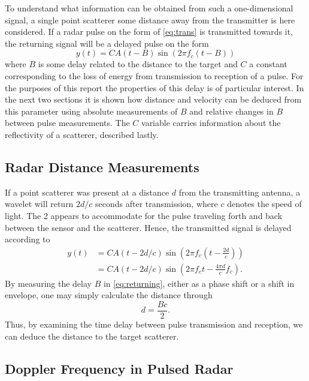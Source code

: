 To understand what information can be obtained from such a one-dimensional signal, a single point scatterer some distance away from the transmitter is here considered. If a radar pulse on the form of \eqref{eq:trans} is transmitted towards it, the returning signal will be a delayed pulse on the form \citep{richards_2014}
\begin{equation}\label{eq:returning}
	y(t) = CA(t-B)\sin(2\pi f_c (t-B))
\end{equation}
where $B$ is some delay related to the distance to the target and $C$ a constant corresponding to the loss of energy from transmission to reception of a pulse. For the purposes of this report the properties of this delay is of particular interest. In the next two sections it is shown how distance and velocity can be deduced from this parameter using absolute measurements of $B$ and relative changes in $B$ between pulse measurements. The $C$ variable carries information about the reflectivity of a scatterer, described lastly. 

\subsection{Radar Distance Measurements}

If a point scatterer was present at a distance $d$ from the transmitting antenna, a wavelet will return $2d/c$ seconds after transmission, where $c$ denotes the speed of light. The 2 appears to accommodate for the pulse traveling forth and back between the sensor and the scatterer. Hence, the transmitted signal is delayed according to 
\begin{equation}
	\begin{split}
		y(t) 
		& = CA(t-2d/c)\sin(2\pi f_c(t - \frac{2d}{c})) \\
		& = CA(t-2d/c)\sin(2\pi f_ct - \frac{4\pi d}{c}f_c).
	\end{split}
\end{equation}
By measuring the delay $B$ in \eqref{eq:returning}, either as a phase shift or a shift in envelope, one may simply calculate the distance through
\begin{equation}
	d = \frac{Bc}{2}.
\end{equation}
Thus, by examining the time delay between pulse transmission and reception, we can deduce the distance to the target scatterer. 

\subsection{Doppler Frequency in Pulsed Radar}\label{sec:doppler}
\label{doppler}

